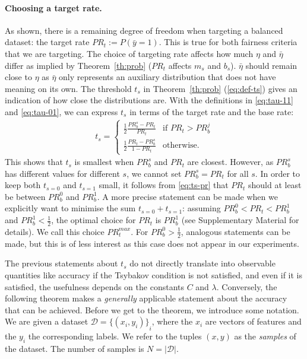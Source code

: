 \paragraph{Choosing a target rate.}
As shown, there is a remaining degree of freedom when targeting a balanced dataset:
the target rate $\mathit{PR}_t := P(\bar{y}=1)$.
This is true for both fairness criteria that we are targeting.
The choice of targeting rate affects how much $\eta$ and $\bar{\eta}$ differ as implied by Theorem~\ref{th:prob}
($\mathit{PR}_t$ affects $m_s$ and $b_s$).
$\bar{\eta}$ should remain close to $\eta$
as $\bar{\eta}$ only represents an auxiliary distribution that does not have meaning on its own.
The threshold $t_s$ in Theorem~\ref{th:prob} (\eqref{eq:def-ts}) gives an indication of how close the distributions are.
With the definitions in \eqref{eq:tau-11} and \eqref{eq:tau-01},
we can express $t_s$ in terms of the target rate and the base rate:
\begin{align}
  t_s = \begin{cases}
    \frac{1}{2}\frac{\mathit{PR}_b^s - \mathit{PR}_t}{\mathit{PR}_t} &\text{if }\mathit{PR}_t>\mathit{PR}_b^j\\
    \frac{1}{2}\frac{\mathit{PR}_t - \mathit{PR}_b^s}{1 - \mathit{PR}_t} &\text{otherwise.}
  \end{cases}\label{eq:ts-pr}
\end{align}
This shows that $t_s$ is smallest when $\mathit{PR}_b^s$ and $\mathit{PR}_t$ are closest.
However, as $\mathit{PR}_b^s$ has different values for different $s$,
we cannot set $\mathit{PR}_b^s=\mathit{PR}_t$ for all $s$.
In order to keep both $t_{s=0}$ and $t_{s=1}$ small,
it follows from \eqref{eq:ts-pr} that $\mathit{PR}_t$ should at least be between $\mathit{PR}_b^0$ and $\mathit{PR}_b^1$.
A more precise statement can be made when we explicitly want to minimise the sum $t_{s=0} + t_{s=1}$:
assuming $\mathit{PR}_b^0<\mathit{PR}_t<\mathit{PR}_b^1$ and $\mathit{PR}_b^1<\tfrac{1}{2}$,
the optimal choice for $\mathit{PR}_t$ is $\mathit{PR}_b^1$ (see Supplementary Material for details).
We call this choice $\mathit{PR}_t^{max}$.
For $\mathit{PR}_b^0>\tfrac{1}{2}$, analogous statements can be made,
but this is of less interest as this case does not appear in our experiments.

The previous statements about $t_s$ do not directly translate into observable quantities like accuracy if the Tsybakov condition is not satisfied,
and even if it is satisfied, the usefulness depends on the constants $C$ and $\lambda$.
Conversely, the following theorem makes a \emph{generally} applicable statement about the accuracy that can be achieved.
Before we get to the theorem, we introduce some notation.
We are given a dataset $\mathcal{D} = {\{(x_i, y_i)\}}_i$,
where the $x_i$ are vectors of features and the $y_i$ the corresponding labels.
We refer to the tuples $(x, y)$ as the \emph{samples} of the dataset.
The number of samples is $N = |\mathcal{D}|$.

